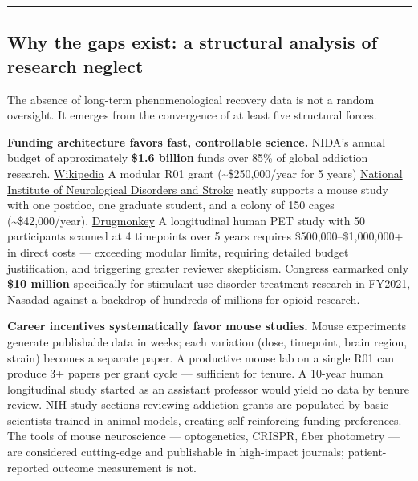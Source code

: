 \begin{center}\rule{0.5\linewidth}{0.5pt}\end{center}

\subsection{Why the gaps exist: a structural analysis of research neglect}\label{14_what_we_dont_know-why-the-gaps-exist-a-structural-analysis-of-research-neglect}

The absence of long-term phenomenological recovery data is not a random oversight. It emerges from the convergence of at least five structural forces.

\textbf{Funding architecture favors fast, controllable science.} NIDA's annual budget of approximately \textbf{\$1.6 billion} funds over 85\% of global addiction research. \href{https://en.wikipedia.org/wiki/National_Institute_on_Drug_Abuse}{Wikipedia} A modular R01 grant (\textasciitilde\$250,000/year for 5 years) \href{https://www.ninds.nih.gov/funding/preparing-your-application/preparing-budget/creating-budget}{National Institute of Neurological Disorders and Stroke} neatly supports a mouse study with one postdoc, one graduate student, and a colony of 150 cages (\textasciitilde\$42,000/year). \href{https://drugmonkey.scientopia.org/2013/03/11/a-full-modular-250k-per-year-nih-grant-doesnt-actually-pay-for-itself/}{Drugmonkey} A longitudinal human PET study with 50 participants scanned at 4 timepoints over 5 years requires \$500,000--\$1,000,000+ in direct costs --- exceeding modular limits, requiring detailed budget justification, and triggering greater reviewer skepticism. Congress earmarked only \textbf{\$10 million} specifically for stimulant use disorder treatment research in FY2021, \href{https://nasadad.org/wp-content/uploads/2020/11/FY-2021-Senate-Recommendations.pdf}{Nasadad} against a backdrop of hundreds of millions for opioid research.

\textbf{Career incentives systematically favor mouse studies.} Mouse experiments generate publishable data in weeks; each variation (dose, timepoint, brain region, strain) becomes a separate paper. A productive mouse lab on a single R01 can produce 3+ papers per grant cycle --- sufficient for tenure. A 10-year human longitudinal study started as an assistant professor would yield no data by tenure review. NIH study sections reviewing addiction grants are populated by basic scientists trained in animal models, creating self-reinforcing funding preferences. The tools of mouse neuroscience --- optogenetics, CRISPR, fiber photometry --- are considered cutting-edge and publishable in high-impact journals; patient-reported outcome measurement is not.

